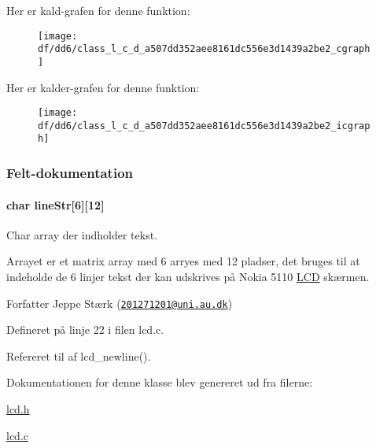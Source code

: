 Her er kald-\/grafen for denne funktion\+:
\nopagebreak
\begin{figure}[H]
\begin{center}
\leavevmode
\texttt{[image: df/dd6/class\_l\_c\_d\_a507dd352aee8161dc556e3d1439a2be2\_cgraph]}
\end{center}
\end{figure}




Her er kalder-\/grafen for denne funktion\+:
\nopagebreak
\begin{figure}[H]
\begin{center}
\leavevmode
\texttt{[image: df/dd6/class\_l\_c\_d\_a507dd352aee8161dc556e3d1439a2be2\_icgraph]}
\end{center}
\end{figure}




\subsubsection{Felt-\/dokumentation}
\paragraph[{\texorpdfstring{line\+Str}{lineStr}}]{\setlength{\rightskip}{0pt plus 5cm}char line\+Str\mbox{[}6\mbox{]}\mbox{[}12\mbox{]}\hspace{0.3cm}{\ttfamily [private]}}\hypertarget{class_l_c_d_a51a220275e6d21942189276ef7d9e7c3}{}\label{class_l_c_d_a51a220275e6d21942189276ef7d9e7c3}


Char array der indholder tekst. 

Arrayet er et matrix array med 6 arryes med 12 pladser, det bruges til at indeholde de 6 linjer tekst der kan udskrives på Nokia 5110 \hyperlink{class_l_c_d}{L\+CD} skærmen.

\begin{DoxyAuthor}{Forfatter}
Jeppe Stærk (\href{mailto:201271201@uni.au.dk}{\tt 201271201@uni.\+au.\+dk}) 
\end{DoxyAuthor}


Defineret på linje 22 i filen lcd.\+c.



Refereret til af lcd\+\_\+newline().



Dokumentationen for denne klasse blev genereret ud fra filerne\+:\begin{DoxyCompactItemize}
\item 
\hyperlink{lcd_8h}{lcd.\+h}\item 
\hyperlink{lcd_8c}{lcd.\+c}\end{DoxyCompactItemize}
